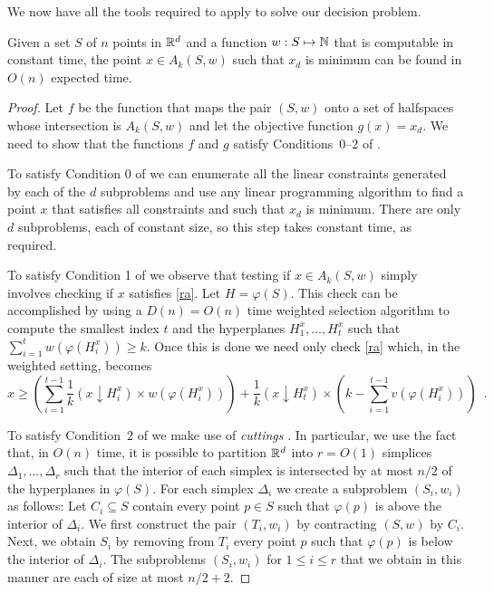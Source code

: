 \documentclass[lotsofwhite]{patmorin}
\newcommand{\drop}{\!\!\downarrow\!\!}
\newcommand{\dual}{\varphi}
\begin{document}
We now have all the tools required to apply  to solve our
decision problem.

\begin{thm}
Given a set $S$ of $n$ points in $\mathbb{R}^d$ and a 
function $w:S\mapsto\mathbb{N}$ that is computable in constant
time, the point $x\in A_k(S,w)$ such
that $x_d$ is minimum can be found in $O(n)$ expected
time.
\end{thm}

\begin{proof}
Let $f$ be the function that maps the pair $(S,w)$ onto a set of
halfspaces whose intersection is $A_k(S,w)$ and let the objective
function $g(x)=x_d$.  We need to show that the functions $f$ and $g$
satisfy Conditions~0--2 of .

To satisfy Condition 0 of  we can enumerate all the
linear constraints generated by each of the $d$ subproblems and use
any linear programming algorithm to find a point $x$ that satisfies
all constraints and such that $x_d$ is minimum.  There are only $d$
subproblems, each of constant size, so this step takes constant time,
as required.

To satisfy Condition 1 of  we observe that testing if
$x\in A_k(S,w)$ simply involves checking if $x$ satisfies \eqref{ra}.
Let $H=\dual(S)$.  This check can be accomplished by using a
$D(n)=O(n)$ time weighted selection algorithm
\cite[Exercise~9-2]{clrs01} to compute the smallest index $t$ and the
hyperplanes $H_{1}^x,\ldots,H_{t}^x$ such that
$\sum_{i=1}^tw(\dual(H_{i}^x)) \ge k$.  Once this is done we need only
check \eqref{ra} which, in the weighted setting, becomes 
\[
     x \ge \left(\sum_{i=1}^{t-1} \frac{1}{k}(x\drop
H_i^x)\times w(\dual(H_i^x))\right) 
   + \frac{1}{k}(x\drop H_t^x) \times \left(k-\sum_{i=1}^{t-1} v(\dual(H_{i}^x)) \right)
\enspace .
\]

To satisfy Condition~2 of  we make use of \emph{cuttings}
\cite[Section~4.7]{mat02}.  In particular, we use the fact that, in
$O(n)$ time, it is possible to partition $\mathbb{R}^d$ into $r=O(1)$
simplices $\Delta_1,\ldots,\Delta_r$ such that the interior of each
simplex is intersected by at most $n/2$ of the hyperplanes in
$\dual(S)$.  For each simplex $\Delta_i$ we create a subproblem
$(S_i,w_i)$ as follows: Let $C_i\subseteq S$ contain every point $p\in
S$ such that $\dual(p)$ is above the interior of $\Delta_i$.  We first
construct the pair $(T_i,w_i)$ by contracting $(S,w)$ by $C_i$.  Next,
we obtain $S_i$ by removing from $T_i$ every point $p$ such that
$\dual(p)$ is below the interior of $\Delta_i$.  The subproblems
$(S_i,w_i)$ for $1\le i\le r$ that we obtain in this manner are each
of size at most $n/2+2$.


\end{proof}
\end{document}
